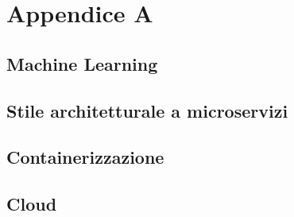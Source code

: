 
\chapter{Appendice A}

\section{Machine Learning}

\section{Stile architetturale a microservizi}

\section{Containerizzazione}

\section{Cloud}

